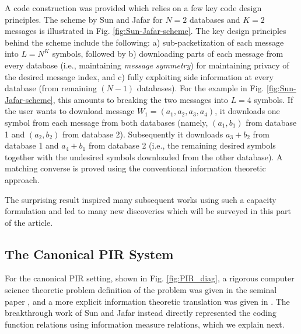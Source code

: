 A code construction was provided which relies on a few key code design principles. The scheme by Sun and Jafar for $N=2$ databases and $K=2$ messages is illustrated in Fig. \ref{fig:Sun-Jafar-scheme}. The key design principles behind the scheme include the following: a) sub-packetization of each message into $L= N^{K}$ symbols, followed by b) downloading parts of each message from every database (i.e., maintaining \textit{message symmetry}) for maintaining privacy of the desired message index, and c) fully exploiting side information at every database (from remaining $(N-1)$ databases). For the example in Fig. \ref{fig:Sun-Jafar-scheme}, this amounts to breaking the two messages into $L=4$ symbols. If the user wants to download message $W_1 = (a_1, a_2, a_3, a_4)$, it downloads one symbol from each message from both databases (namely, $(a_1, b_1)$ from database 1 and $(a_2, b_2)$ from database 2). Subsequently it downloads $a_3 + b_2$ from database 1 and $a_4+ b_1$ from database 2 (i.e., the remaining desired symbols together with the undesired symbols downloaded from the other database). A matching converse is proved using the conventional information theoretic approach. 

The surprising result inspired many subsequent works using such a capacity formulation and led to many new discoveries which will be surveyed in this part of the article. 

\subsection{The Canonical PIR System}

For the canonical PIR setting, shown in Fig. \ref{fig:PIR_diag}, a rigorous computer science theoretic problem definition of the problem was given in the seminal paper \cite{PIRfirst}, and a more explicit information theoretic translation was given in \cite{tian2019capacity}. 
The breakthrough work of Sun and Jafar \cite{sun2017PIRcapacity} instead directly represented the coding function relations using information measure relations, which we explain next.


